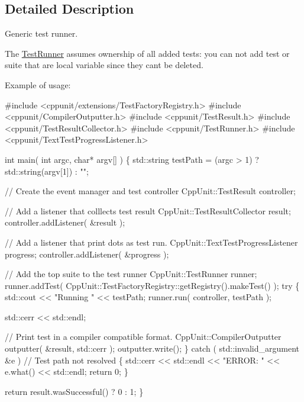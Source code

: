 \subsection{Detailed Description}
Generic test runner.

The \hyperlink{class_test_runner}{Test\+Runner} assumes ownership of all added tests\+: you can not add test or suite that are local variable since they can\textquotesingle{}t be deleted. 

Example of usage\+: 
\begin{DoxyCode}
\textcolor{preprocessor}{#include <cppunit/extensions/TestFactoryRegistry.h>}
\textcolor{preprocessor}{#include <cppunit/CompilerOutputter.h>}
\textcolor{preprocessor}{#include <cppunit/TestResult.h>}
\textcolor{preprocessor}{#include <cppunit/TestResultCollector.h>}
\textcolor{preprocessor}{#include <cppunit/TestRunner.h>}
\textcolor{preprocessor}{#include <cppunit/TextTestProgressListener.h>}


\textcolor{keywordtype}{int} 
main( \textcolor{keywordtype}{int} argc, \textcolor{keywordtype}{char}* argv[] )
\{
  std::string testPath = (argc > 1) ? std::string(argv[1]) : \textcolor{stringliteral}{""};

  \textcolor{comment}{// Create the event manager and test controller}
  CppUnit::TestResult controller;

  \textcolor{comment}{// Add a listener that colllects test result}
  CppUnit::TestResultCollector result;
  controller.addListener( &result );        

  \textcolor{comment}{// Add a listener that print dots as test run.}
  CppUnit::TextTestProgressListener progress;
  controller.addListener( &progress );      

  \textcolor{comment}{// Add the top suite to the test runner}
  CppUnit::TestRunner runner;
  runner.addTest( CppUnit::TestFactoryRegistry::getRegistry().makeTest() );   
  \textcolor{keywordflow}{try}
  \{
    std::cout << \textcolor{stringliteral}{"Running "}  <<  testPath;
    runner.run( controller, testPath );

    std::cerr << std::endl;

    \textcolor{comment}{// Print test in a compiler compatible format.}
    CppUnit::CompilerOutputter outputter( &result, std::cerr );
    outputter.write();                      
  \}
  \textcolor{keywordflow}{catch} ( std::invalid\_argument &e )  \textcolor{comment}{// Test path not resolved}
  \{
    std::cerr  <<  std::endl  
               <<  \textcolor{stringliteral}{"ERROR: "}  <<  e.what()
               << std::endl;
    \textcolor{keywordflow}{return} 0;
  \}

  \textcolor{keywordflow}{return} result.wasSuccessful() ? 0 : 1;
\}
\end{DoxyCode}
 

